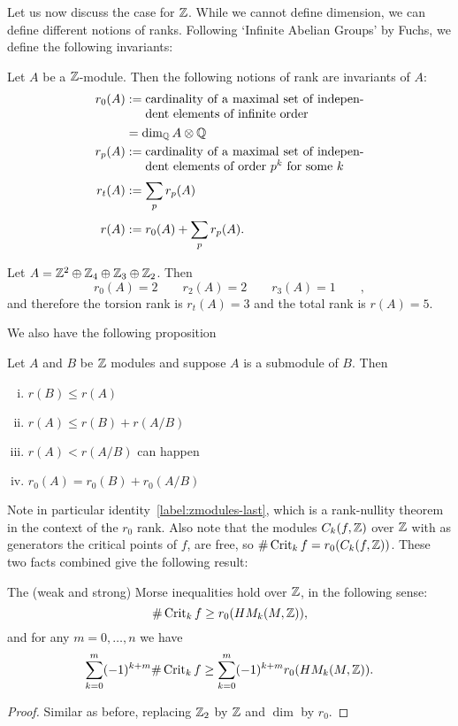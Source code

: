 Let us now discuss the case for $\Z$.
While we cannot define dimension, we can define different notions of ranks. Following `Infinite Abelian Groups' by Fuchs, we define the following invariants:
\begin{definition}[Rank]
    Let $A$ be a  $\Z$-module. Then the following notions of rank are invariants of $A$:
    \begin{align*}
        r_0(A) &:= \parbox[t]{6.2cm}{cardinality of a maximal set of independent elements of infinite order}\\[0.3em]
            &= \dim_{\Q} A \otimes \Q\\
        r_p(A) &:= \parbox[t]{6.2cm}{cardinality of a maximal set of independent elements of order $p^{k}$ for some $k$}\\[0.3em]
        r_t(A) &:= \sum_{p} r_p(A)\\[0.3em]
        r(A) &:= r_0(A) + \sum_{p}r_p(A)
    .\end{align*}
\end{definition}
\begin{eg}
    Let $A = \Z^2 \oplus \Z_4 \oplus \Z_3 \oplus \Z_2$.
    Then
    \[
        r_0(A) = 2 \qquad
        r_2(A) = 2 \qquad
        r_3(A) = 1 \qquad
    ,\] 
    and therefore the torsion rank is $r_t(A) = 3$ and the total rank is $r(A) = 5$.
\end{eg}
We also have the following proposition
\begin{lemma}
    Let $A$ and $B$ be $\Z$ modules and suppose $A$ is  a submodule of $B$.
    Then
    \begin{enumerate}[(i)]
        \item $r(B) \le  r(A)$
        \item $r(A) \le  r(B) + r(A / B)$
        \item $r(A) < r(A / B)$ can happen
        \item  $ r_0(A) = r_0(B) + r_0(A/B)$ \label{label:zmodules-last}
    \end{enumerate}
\end{lemma}

Note in particular identity~\ref{label:zmodules-last}, which is a rank-nullity theorem in the context of the $r_0$ rank.
Also note that the modules $C_k(f, \Z)$ over $\Z$ with as generators the critical points of $f$, are free, so $\# \Crit_k f =r_0(C_k(f, \Z))$.
These two facts combined give the following result:
\begin{prop}
    The (weak and strong) Morse inequalities hold over $\Z$, in the following sense:
    \[
        \# \Crit_k f \ge  r_0(\HMf[k]{M, \Z})
    ,\] 
    and for any $m = 0, \ldots, n$ we have
        \[
            \sum_{k=0}^{m} (-1)^{k+m} \# \Crit_k f \ge  \sum_{k=0}^{m} (-1)^{k+m} r_0(\HMf[k]{M, \Z})
        .\] 
\end{prop}
\begin{proof}
    Similar as before, replacing $\Z_2$ by $\Z$ and $\dim$ by $r_0$.
\end{proof}


